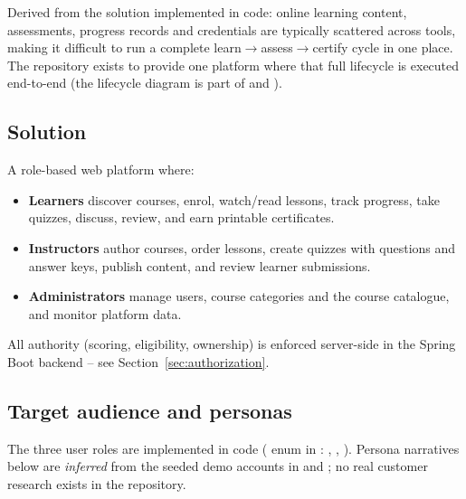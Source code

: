 Derived from the solution implemented in code: online learning content, assessments, progress records and credentials are typically scattered across tools, making it difficult to run a complete learn$\rightarrow$assess$\rightarrow$certify cycle in one place. The repository exists to provide one platform where that full lifecycle is executed end-to-end (the lifecycle diagram is part of  and ).

\subsection{Solution}

A role-based web platform where:

\begin{itemize}
    \item \textbf{Learners} discover courses, enrol, watch/read lessons, track progress, take quizzes, discuss, review, and earn printable certificates.
    \item \textbf{Instructors} author courses, order lessons, create quizzes with questions and answer keys, publish content, and review learner submissions.
    \item \textbf{Administrators} manage users, course categories and the course catalogue, and monitor platform data.
\end{itemize}

\noindent All authority (scoring, eligibility, ownership) is enforced server-side in the Spring Boot backend -- see Section~\ref{sec:authorization}.

\subsection{Target audience and personas}

The three user roles are implemented in code ( enum in : , , ). Persona narratives below are \emph{inferred} from the seeded demo accounts in  and ; no real customer research exists in the repository.

